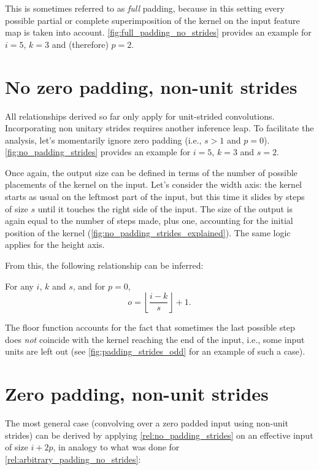 \noindent This is sometimes referred to as {\em full\/} padding, because in this
setting every possible partial or complete superimposition of the kernel on the
input feature map is taken into account. \autoref{fig:full_padding_no_strides}
provides an example for $i = 5$, $k = 3$ and (therefore) $p = 2$.

\section{No zero padding, non-unit strides}

All relationships derived so far only apply for unit-strided convolutions.
Incorporating non unitary strides requires another inference leap. To
facilitate the analysis, let's momentarily ignore zero padding (i.e., $s > 1$
and $p = 0$). \autoref{fig:no_padding_strides} provides an example for $i =
5$, $k = 3$ and $s = 2$.

Once again, the output size can be defined in terms of the number of possible
placements of the kernel on the input. Let's consider the width axis: the
kernel starts as usual on the leftmost part of the input, but this time it
slides by steps of size $s$ until it touches the right side of the input. The
size of the output is again equal to the number of steps made, plus one,
accounting for the initial position of the kernel
(\autoref{fig:no_padding_strides_explained}). The same logic applies for the
height axis.

From this, the following relationship can be inferred:

\begin{relationship}\label{rel:no_padding_strides}
For any $i$, $k$ and $s$, and for $p = 0$,
\begin{equation*}
    o = \left\lfloor \frac{i - k}{s} \right\rfloor + 1.
\end{equation*}
\end{relationship}

\noindent The floor function accounts for the fact that sometimes the last
possible step does {\em not\/} coincide with the kernel reaching the end of the
input, i.e., some input units are left out (see
\autoref{fig:padding_strides_odd} for an example of such a case).

\section{Zero padding, non-unit strides}

The most general case (convolving over a zero padded input using non-unit
strides) can be derived by applying \autoref{rel:no_padding_strides} on an
effective input of size $i + 2p$, in analogy to what was done for
\autoref{rel:arbitrary_padding_no_strides}:

